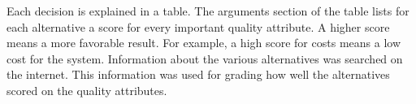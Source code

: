 Each decision is explained in a table. The arguments section of the table lists for each alternative a score for every important quality attribute.
A higher score means a more favorable result. For example, a high score for costs means a low cost for the system. Information about the various alternatives was searched on the internet. This information was used for grading how well the alternatives scored on the quality attributes.
\\[1.0cm]


